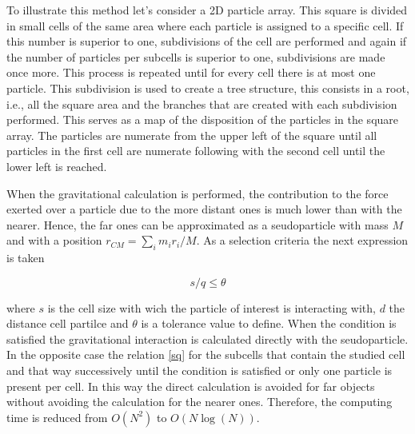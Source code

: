 \begin{enumerate}
To illustrate this method let's consider a 2D particle array. 
This square is divided in small cells of the same area where
each particle is assigned to a specific cell. 
If this number is superior to one, subdivisions of the cell
are performed and again if the number of particles per subcells 
is superior to one, subdivisions are made once more. This
process is repeated until for every cell there is at most
one particle. 
This subdivision is used to create a tree structure, this consists
in a root, i.e., all the square area and the branches that are 
created with each subdivision performed. This serves as a map
of the disposition of the particles in the square array. 
The particles are numerate from the upper left of the square 
until all particles in the first cell are numerate following with
the second cell until the lower left is reached. 

When the gravitational calculation is performed, the contribution 
to the force exerted over a particle due to the more distant ones
is much lower than with the nearer. Hence, the far ones can be 
approximated as a seudoparticle with mass $M$ and with a position
$r_{CM}=\sum_im_ir_i/M$. As a selection criteria the next expression
is taken

\begin{equation}
s/q\leq \theta
\label{sq}
\end{equation}

where $s$ is the cell size with wich the particle of interest is interacting 
with, $d$ the distance cell partilce and $\theta$ is a tolerance value to
define. When the condition is satisfied the gravitational interaction 
is calculated directly with the seudoparticle. In the opposite case the 
relation \ref{sq} for the subcells that contain the studied cell and that way
successively until the condition is satisfied or only one particle is 
present per cell. In this way the direct calculation is avoided for far
objects without avoiding the calculation for the nearer ones. 
Therefore, the computing time is reduced from $O(N^2)$ to $O(N\log(N))$.


\end{enumerate}
